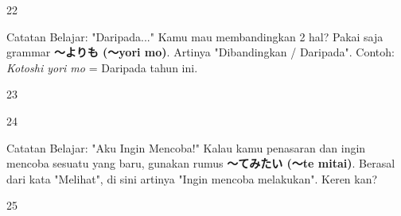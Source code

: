 \begin{convobox}{22}
    \noindent
      
      
      

    \vspace{1.5em}
\end{convobox}

\begin{lessonbox}{Catatan Belajar: "Daripada..."}
    Kamu mau membandingkan 2 hal? Pakai saja grammar \textbf{〜よりも (〜yori mo)}. Artinya "Dibandingkan / Daripada". Contoh: \textit{Kotoshi yori mo} = Daripada tahun ini.
\end{lessonbox}

\begin{convobox}{23}
    \noindent
      
     

    \vspace{1.5em}
\end{convobox}

\begin{convobox}{24}
    \noindent

    \vspace{1.5em}
\end{convobox}

\begin{lessonbox}{Catatan Belajar: "Aku Ingin Mencoba!"}
    Kalau kamu penasaran dan ingin mencoba sesuatu yang baru, gunakan rumus \textbf{〜てみたい (〜te mitai)}. Berasal dari kata "Melihat", di sini artinya "Ingin mencoba melakukan". Keren kan?
\end{lessonbox}

\begin{convobox}{25}
    \noindent
      

    \vspace{1.5em}
\end{convobox}

